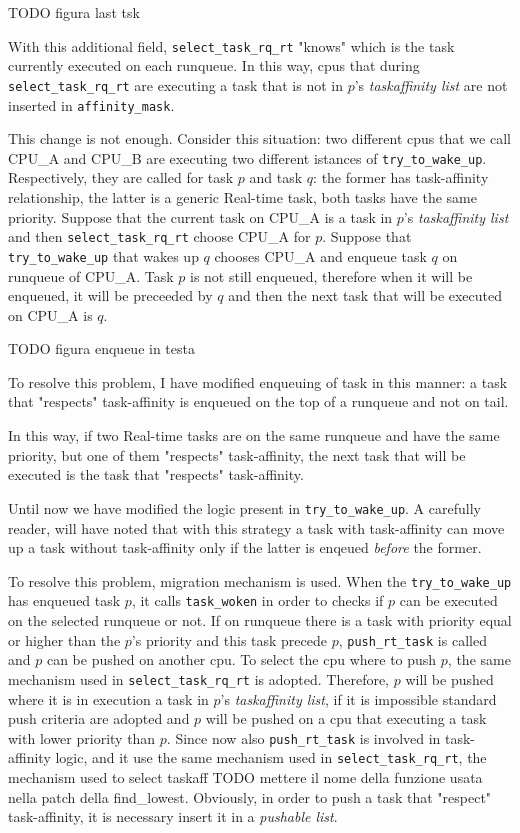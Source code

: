 TODO figura last tsk

With this additional field, \texttt{select\_task\_rq\_rt} "knows" which is the task currently executed on each runqueue. In this way, cpus that during 
\texttt{select\_task\_rq\_rt} are executing a task that is not in $p$'s \textit{taskaffinity list} are not inserted in \texttt{affinity\_mask}.

This change is not enough. Consider this situation: two different cpus that we call CPU\_A and CPU\_B are executing two different istances of 
\texttt{try\_to\_wake\_up}. Respectively, they are called for task $p$ and task $q$: the former has task-affinity relationship, the latter is a generic 
Real-time task, both tasks have the same priority. Suppose that the current task on CPU\_A is a task in $p$'s \textit{taskaffinity list} and then 
\texttt{select\_task\_rq\_rt} choose CPU\_A for $p$. Suppose that \texttt{try\_to\_wake\_up} that wakes up $q$ chooses CPU\_A and enqueue task $q$ on 
runqueue of CPU\_A. Task $p$ is not still enqueued, therefore when it will be enqueued, it will be preceeded by $q$ and then the next task that will
be executed on CPU\_A is $q$.

TODO figura enqueue in testa

To resolve this problem, I have modified enqueuing of task in this manner: a task that "respects" task-affinity is enqueued on the top of a runqueue and not 
on tail. 

In this way, if two Real-time tasks are on the same runqueue and have the same priority, but one of them "respects" task-affinity, the next task that 
will be executed is the task that "respects" task-affinity. 

Until now we have modified the logic present in \texttt{try\_to\_wake\_up}. A carefully reader, will have noted that with this strategy a task with 
task-affinity can move up a task without task-affinity only if the latter is enqeued \textit{before} the former.

To resolve this problem, migration mechanism is used. When the \texttt{try\_to\_wake\_up} has enqueued task $p$, it calls \texttt{task\_woken} in order to
checks if $p$ can be executed on the selected runqueue or not. If on runqueue there is a task with priority equal or higher than the $p$'s priority and 
this task precede $p$, \texttt{push\_rt\_task} is called and $p$ can be pushed on another cpu. To select the cpu where to push $p$, the same mechanism used 
in \texttt{select\_task\_rq\_rt} is adopted. Therefore, $p$ will be pushed where it is in execution a task in $p$'s \textit{taskaffinity list}, if it is 
impossible standard push criteria are adopted and $p$ will be pushed on a cpu that executing a task with lower priority than $p$. Since now also 
\texttt{push\_rt\_task} is involved in task-affinity logic, and it use the same mechanism used in \texttt{select\_task\_rq\_rt},  the mechanism used to 
select taskaff TODO mettere il nome della funzione usata nella patch della find\_lowest. Obviously, in order to push a task that "respect" task-affinity, 
it is necessary insert it in a \textit{pushable list}.  


